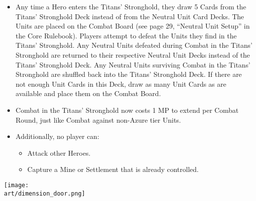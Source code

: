 \begin{multicols*}{2}
\begin{itemize}
  \item Any time a Hero enters the Titans' Stronghold, they draw 5 Cards from the Titans' Stronghold Deck instead of from the Neutral Unit Card Decks. The Units are placed on the Combat Board (see page 29, ``Neutral Unit Setup'' in the Core Rulebook). Players attempt to defeat the Units they find in the Titans' Stronghold. Any Neutral Units defeated during Combat in the Titans' Stronghold are returned to their respective Neutral Unit Decks instead of the Titans' Stronghold Deck. Any Neutral Units surviving Combat in the Titans' Stronghold are shuffled back into the Titans' Stronghold Deck. If there are not enough Unit Cards in this Deck, draw as many Unit Cards as are available and place them on the Combat Board.
  \item Combat in the Titans' Stronghold now costs 1 MP to extend per Combat Round, just like Combat against non-Azure tier Units.
  \item Additionally, no player can:
  \begin{itemize}
    \item Attack other Heroes.
    \item Capture a Mine or Settlement that is already controlled.
  \end{itemize}
\end{itemize}

\vspace*{\fill}

\begin{center}
  \texttt{[image: \\art/dimension\_door.png]}
\end{center}

\vspace*{\fill}

\end{multicols*}

\newpage

